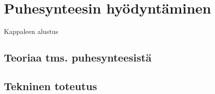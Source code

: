 \chapter{Puhesynteesin hyödyntäminen}%
\label{ch:puhesynteesi}

Kappaleen alustus

\section{Teoriaa tms. puhesynteesistä}

\section{Tekninen toteutus}
